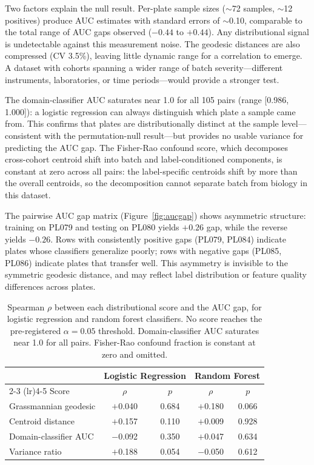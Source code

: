 \documentclass{article}
\begin{document}
Two factors explain the null result. Per-plate sample sizes ($\sim$72 samples, $\sim$12 positives) produce AUC estimates with standard errors of $\sim$0.10, comparable to the total range of AUC gaps observed ($-0.44$ to $+0.44$). Any distributional signal is undetectable against this measurement noise. The geodesic distances are also compressed (CV 3.5\%), leaving little dynamic range for a correlation to emerge. A dataset with cohorts spanning a wider range of batch severity---different instruments, laboratories, or time periods---would provide a stronger test.

The domain-classifier AUC saturates near 1.0 for all 105 pairs (range [0.986, 1.000]): a logistic regression can always distinguish which plate a sample came from. This confirms that plates are distributionally distinct at the sample level---consistent with the permutation-null result---but provides no usable variance for predicting the AUC gap. The Fisher-Rao confound score, which decomposes cross-cohort centroid shift into batch and label-conditioned components, is constant at zero across all pairs: the label-specific centroids shift by more than the overall centroids, so the decomposition cannot separate batch from biology in this dataset.

The pairwise AUC gap matrix (Figure~\ref{fig:aucgap}) shows asymmetric structure: training on PL079 and testing on PL080 yields $+0.26$ gap, while the reverse yields $-0.26$. Rows with consistently positive gaps (PL079, PL084) indicate plates whose classifiers generalize poorly; rows with negative gaps (PL085, PL086) indicate plates that transfer well. This asymmetry is invisible to the symmetric geodesic distance, and may reflect label distribution or feature quality differences across plates.

\begin{table}[t]
\centering
\caption{Spearman $\rho$ between each distributional score and the AUC gap, for logistic regression and random forest classifiers. No score reaches the pre-registered $\alpha = 0.05$ threshold. Domain-classifier AUC saturates near 1.0 for all pairs. Fisher-Rao confound fraction is constant at zero and omitted.}
\label{tab:baselines}
\begin{tabular}{lcccc}
\toprule
 & \multicolumn{2}{c}{Logistic Regression} & \multicolumn{2}{c}{Random Forest} \\
\cmidrule(lr){2-3} \cmidrule(lr){4-5}
Score & $\rho$ & $p$ & $\rho$ & $p$ \\
\midrule
Grassmannian geodesic    & $+$0.040 & 0.684 & $+$0.180 & 0.066 \\
Centroid distance        & $+$0.157 & 0.110 & $+$0.009 & 0.928 \\
Domain-classifier AUC    & $-$0.092 & 0.350 & $+$0.047 & 0.634 \\
Variance ratio           & $+$0.188 & 0.054 & $-$0.050 & 0.612 \\
\bottomrule
\end{tabular}
\end{table}
\end{document}
